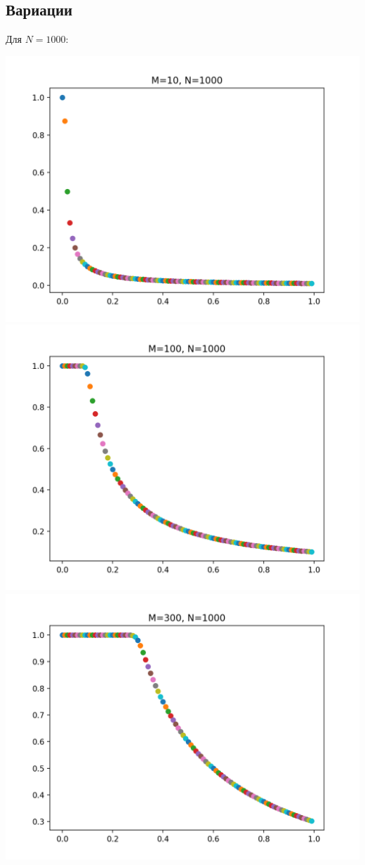 \subsection{Вариации}

Для $N=1000$:

\includegraphics[scale=0.5]{img/1000_10}
\includegraphics[scale=0.5]{img/1000_100}
\includegraphics[scale=0.5]{img/1000_300}
